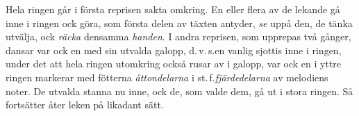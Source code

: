 Hela ringen går i första reprisen sakta omkring. En eller flera av de lekande gå inne i ringen ock göra, som första delen av täxten antyder, \textit{se} uppå den, de tänka utvälja, ock \textit{räcka} densamma \textit{handen}. I andra reprisen, som upprepas två gånger, dansar var ock en med sin utvalda \guillemotright{}galopp\guillemotright{}, d.\,v.\,s.\@ en vanlig \guillemotright{}sjottis\guillemotright{} inne i ringen, under det att hela ringen utomkring också rusar av \guillemotright{}i galopp\guillemotright{}, var ock en i yttre ringen markerar med fötterna \textit{åttondelarna} i st.\,f.\@ \textit{fjärdedelarna} av melodiens noter. De \guillemotright{}utvalda\guillemotright{} stanna nu inne, ock de, som valde dem, gå ut i stora ringen. Så fortsätter åter leken på likadant sätt.
